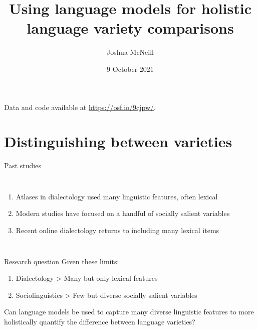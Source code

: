 \documentclass{beamer}\usepackage[]{graphicx}\usepackage[]{color}
\title[Using LMs for variety comparisons]{Using language models for holistic language variety comparisons}
\author{Joshua McNeill}
\institute{University of Georgia}
\date{9 October 2021}
\begin{document}
  \begin{frame}
    \titlepage
    \tiny{
      Data and code available at \url{https://osf.io/9cjpw/}.
    }
  \end{frame}

  \begin{frame}
    \tableofcontents[hideallsubsections]
  \end{frame}


  \section{Distinguishing between varieties}
    \begin{frame}{Past studies}
      \begin{columns}
          \begin{enumerate}
            \item \alert{Atlases in dialectology} used many linguistic features, often lexical \parencite{gillieron_atlas_1902, wenker_sprach-atlas_2020}
            \item \alert{Modern studies} have focused on a handful of socially salient variables \parencite{dubois_verbal_2003, eckert_phonetics_2017, rickford_addressee-_1994}
            \item \alert{Recent online dialectology} returns to including many lexical items \parencite{eisenstein_identifying_2014, grieve_mapping_2018, pavalanathan_audience-modulated_2015}
          \end{enumerate}
      \end{columns}
    \end{frame}

    \begin{frame}{Research question}
      Given these limits:
      \begin{enumerate}
        \item Dialectology > Many but only \alert{lexical} features
        \item Sociolinguistics > \alert{Few} but diverse socially salient variables
      \end{enumerate}
      Can language models be used to capture many diverse linguistic features to more holistically quantify the difference between language varieties?
    \end{frame}
\end{document}
